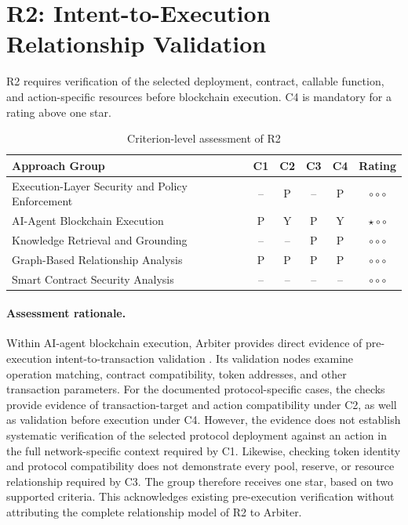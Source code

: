 
\section{R2: Intent-to-Execution Relationship Validation}

R2 requires verification of the selected deployment,
contract, callable function, and action-specific
resources before blockchain execution. C4 is
mandatory for a rating above one star.

\begin{table}[H]
\centering
\small
\renewcommand{\arraystretch}{1.25}
\begin{tabular}{p{5.0cm}ccccc}
\hline
\textbf{Approach Group}
& \textbf{C1}
& \textbf{C2}
& \textbf{C3}
& \textbf{C4}
& \textbf{Rating} \\
\hline

Execution-Layer Security and Policy Enforcement
& -- & P & -- & P
& $\circ\circ\circ$ \\

AI-Agent Blockchain Execution
& P & Y & P & Y
& $\star\circ\circ$ \\

Knowledge Retrieval and Grounding
& -- & -- & P & P
& $\circ\circ\circ$ \\

Graph-Based Relationship Analysis
& P & P & P & P
& $\circ\circ\circ$ \\

Smart Contract Security Analysis
& -- & -- & -- & --
& $\circ\circ\circ$ \\

\hline
\end{tabular}
\caption{Criterion-level assessment of R2}
\label{tab:appendix_r2}
\end{table}

\paragraph{Assessment rationale.}

Within AI-agent blockchain execution, Arbiter
provides direct evidence of pre-execution
intent-to-transaction validation
\cite{yaoArbiter2026}. Its validation nodes
examine operation matching, contract compatibility,
token addresses, and other transaction parameters. For the documented protocol-specific cases, the checks
provide evidence of transaction-target and action
compatibility under C2, as well as validation before
execution under C4.
However, the evidence does not establish systematic
verification of the selected protocol deployment
against an action in the full network-specific
context required by C1. Likewise, checking token
identity and protocol compatibility does not
demonstrate every pool, reserve, or resource
relationship required by C3. The group therefore receives one star, based on
two supported criteria. This acknowledges existing
pre-execution verification without attributing
the complete relationship model of R2 to Arbiter.

